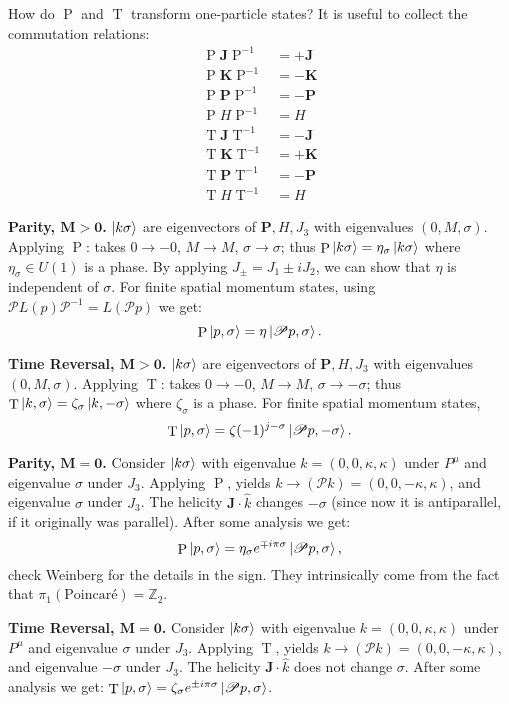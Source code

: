\documentclass[10pt]{article}
\newcommand{\bZ}{\mathbb Z}
\newcommand{\ms}{\mathscr}
\newcommand{\sg}{\sigma}
\theoremstyle{plain}
\theoremstyle{definition}
\theoremstyle{remark}
\DeclareMathOperator{\rP}{P}
\DeclareMathOperator{\rT}{T}
\begin{document}
How do $\rP$ and $\rT$ transform one-particle states?
It is useful to collect the commutation relations:
\begin{align}
    \rP \bm J \rP^{-1} &= +\bm J\label{eqn:PJ}\\
    \rP \bm K \rP^{-1} &= -\bm K\label{eqn:PK}\\
    \rP \bm P \rP^{-1} &= -\bm P\label{eqn:PP}\\
    \rP  H \rP^{-1} &=  H\label{eqn:PH}\\
    \rT \bm J \rT^{-1} &= -\bm J\label{eqn:TJ}\\
    \rT \bm K \rT^{-1} &= +\bm K\label{eqn:TK}\\
    \rT \bm P \rT^{-1} &= -\bm P\label{eqn:TP}\\
    \rT  H \rT^{-1} &=  H\label{eqn:TH}
\end{align}

\textbf{Parity, $\bm{M>0}$.}
$\ket{k\sg}$ are eigenvectors of $\bm P, H, J_3$ with eigenvalues
$(0,M,\sg)$. Applying $\rP$: takes $0\to -0$, $M\to M$, $\sg\to\sg$;
thus $\rP\ket{k\sg} = \eta_\sg\ket{k\sg}$ where $\eta_\sg\in U(1)$ is
a phase. By applying $J_\pm = J_1\pm iJ_2$, we can show that $\eta$ is
independent of $\sg$. For finite spatial momentum states,
using $\ms P L(p) \ms P^{-1} = L(\ms P p)$ we get:
\[\rP \ket{p,\sg} = \eta\ket{\ms Pp,\sg}.\]

\textbf{Time Reversal, $\bm{M>0}$.}
$\ket{k\sg}$ are eigenvectors of $\bm P, H, J_3$ with eigenvalues
$(0,M,\sg)$. Applying $\rT$: takes $0\to -0$, $M\to M$, $\sg\to-\sg$;
thus $\rT\ket{k,\sg} = \zeta_\sg\ket{k,-\sg}$ where $\zeta_\sg$ is
a phase. For finite spatial momentum states,
\[\rT \ket{p,\sg} = \zeta(-1)^{j-\sg}\ket{\ms Pp,-\sg}.\]


\textbf{Parity, $\bm{M=0}$.}
Consider $\ket{k\sg}$ with eigenvalue $k=(0,0,\kappa,\kappa)$ under $P^\mu$ and eigenvalue $\sg$ under $J_3$.
Applying $\rP$, yields $k\to (\ms Pk) = (0,0,-\kappa,\kappa)$, and eigenvalue $\sg$ under $J_3$.
The helicity $\bm J\cdot \hat k$ changes $-\sg$ (since now it is antiparallel, if it originally was parallel).
After some analysis we get:
\[ \rP \ket{p,\sg} = \eta_\sg e^{\mp i\pi\sg}\ket{\ms Pp,\sg},\]
check Weinberg for the details in the sign. They intrinsically come
from the fact that $\pi_1(\text{Poincar\'e})=\bZ_2$.

\textbf{Time Reversal, $\bm{M=0}$.}
Consider $\ket{k\sg}$ with eigenvalue $k=(0,0,\kappa,\kappa)$ under $P^\mu$ and eigenvalue $\sg$ under $J_3$.
Applying $\rT$, yields $k\to (\ms Pk) = (0,0,-\kappa,\kappa)$, and eigenvalue $-\sg$ under $J_3$.
The helicity $\bm J\cdot \hat k$ does not change $\sg$.
After some analysis we get: $\rT \ket{p,\sg} = \zeta_\sg e^{\pm i\pi\sg}\ket{\ms Pp,\sg}$.
\end{document}
